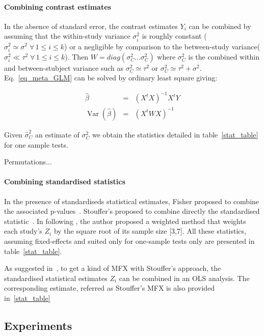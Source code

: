 \documentclass{llncs}
\DeclareMathOperator{\Var}{Var}
\newcommand{\effectvector}{Y}
\newcommand{\effect}[1][i]{\effectvector_{#1}}
\newcommand{\zeffect}[1][i]{Z_{#1}}
\newcommand{\nStudies}{k}
\newcommand{\varCombined}{\sigma^2_{C}}
\newcommand{\varBetween}{\tau^2}
\newcommand{\varWithinCommon}{\sigma^2}
\newcommand{\varWithin}[1][i]{\sigma^2_{#1}}
\begin{document}
\paragraph{Combining contrast estimates}
In the absence of standard error, the contrast estimates $\effect$ can be combined by assuming that the within-study variance $\varWithin$ is roughly constant ($\varWithin \simeq \sigma^2 \; \forall \, 1 \le i \le \nStudies $) or a negligible by comparison to the between-study variance($\varWithin \ll \varBetween \; \forall \, 1 \le i \le \nStudies $). Then $W = diag( \varCombined \ldots \varCombined )$ where $\varCombined$ is the combined within and between-stubject variance such as $\varCombined \simeq \varBetween$ or $\varCombined \simeq \varBetween + \varWithinCommon$. Eq.~\eqref{eq_meta_GLM} can be solved by ordinary least square giving:

\begin{eqnarray}
	\hat \beta  &=& (X^t X)^{-1} X^t \effectvector \\
	\Var(\hat \beta)  &=& (X^t W X)^{-1}
	\label{eq_OLS}
\end{eqnarray}

Given $\hat\varCombined$ an estimate of $\varCombined$ we obtain the statistics detailed in table~\ref{stat_table} for one sample tests.

Permutations...

\paragraph{Combining standardised statistics} 
In the presence of standardiseds statistical estimates, Fisher proposed to combine the associated p-values~\cite{Fisher1932}. Stouffer's proposed to combine directly the standardised statistic~\cite{Stouffer1949}. In \cite{Zaykin2011} following \cite{Liptak1958}, the author proposed a weighted method that weights each study's $\zeffect$ by the square root of its sample size [3,7]. All these statistics, assuming fixed-effects and suited only for one-sample tests only are presented in table~\ref{stat_table}.

As suggested in~\cite{Salimi-khorshidi2009}, to get a kind of MFX with Stouffer's approach, the standardised statistical estimates $\zeffect$ can be combined in an OLS analysis. The corresponding estimate, referred as Stouffer's MFX is also provided in~\ref{stat_table}

\subsection{Experiments}
\end{document}
